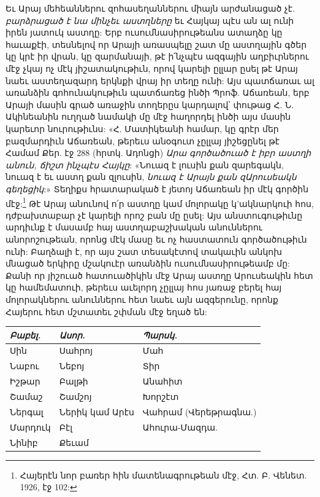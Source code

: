 \documentclass{article}
\begin{document}
{Եւ Արայ մեհեաններու զոհասեղաններու միայն արժանացած չէ. \emph{բարձրացած է նա մինչեւ աստղները} եւ Հայկայ պէս ան ալ ունի իրեն յատուկ աստղը: Երբ ուսումնասիրութեանս ատաղձը կը հաւաքէի, տեսնելով որ Արայի առասպելը շատ մը աստղային գծեր կը կրէ իր վրան, կը զարմանայի, թէ ի՛նչպէս ազգային աղբիւրներու մէջ չկայ ոչ մէկ յիշատակութիւն, որով կարելի ըլլար ըսել թէ Արայ նաեւ աստեղազարդ երկնքի վրայ իր տեղը ունի: Այս պատճառաւ ալ առանձին գոհունակութիւն պատճառեց ինծի Պրոֆ. Աճառեան, երբ Արայի մասին գրած առաջին տողերըս կարդալով՝ փութաց Հ. Ն. Ակինեանին ուղղած նամակի մը մէջ հաղորդել ինծի այս մասին կարեւոր նուրութիւնս: «Հ. Մատիկեանի համար, կը գրէր մեր բազմարդիւն Աճառեան, թերեւս անօգուտ չըլլայ յիշեցընել թէ Համամ Քեր. էջ 288 (հրտկ. Ադոնցի) \emph{Արա գործածուած է իբր աստղի անուն, ճիշտ ինչպէս Հայկը}: «Նուազ է լուսին քան զարեգակն, նուազ է եւ աստղ քան զլուսին, \emph{նուազ է Արայն քան զԱրուսեակն գեղեցիկ}:» Տեղիքս հրատարակած է յետոյ Աճառեան իր մէկ գործին մէջ:\footnote{Հայերէն նոր բառեր հին մատենագրութեան մէջ, Հտ. Բ. Վենետ. 1926, էջ 102:} Թէ Արայ անունով ո՛ր աստղը կամ մոլորակը կ'ակնարկուի հոս, դժբախտաբար չէ կարելի որոշ բան մը ըսել: Այս անստուգութիւնը արդիւնք է մասամբ հայ աստղաբաշխական անուններու անորոշութեան, որոնց մէկ մասը եւ ոչ հաստատուն գործածութիւն ունի: Բաղձալի է, որ այս շատ տեսակէտով տակաւին անկոխ մնացած երկիրը մշակուէր առանձին ուսումնասիրութեամբ մը: Քանի որ յիշուած հատուածիկին մէջ Արայ աստղը Արուսեակին հետ կը համեմատուի, թերեւս աւելորդ չըլլայ հոս յառաջ բերել հայ մոլորակներու անուններու հետ նաեւ այն ազգերունը, որոնք Հայերու հետ մշտատեւ շփման մէջ եղած են:}

\begin{table}[H]
    \centering
    \arm
    \small
    \begin{tabular}{l l l}
        \emph{Բաբել.}  &  \emph{Ասոր.}         &  \emph{Պարսկ.}              \\ \hline
         Սին       &  Սահրոյ          &  Մահ                   \\
         Նաբու     &  Նեբոյ           &  Տիր                   \\ 
         Իշթար     &  Բալթի           &  Անահիտ                \\ 
         Շամաշ     &  Շամշոյ          &  Խորշէտ                \\
         Ներգալ    &  Ներիկ կամ Արէս  &  Վահրամ (Վերեթրագնա.)  \\ 
         Մարդուկ   &  Բէլ             &  Ահուրա-Մազդա.         \\
         Նինիբ     &  Քեւամ           & ~ \\
    \end{tabular}
\end{table}
\end{document}
